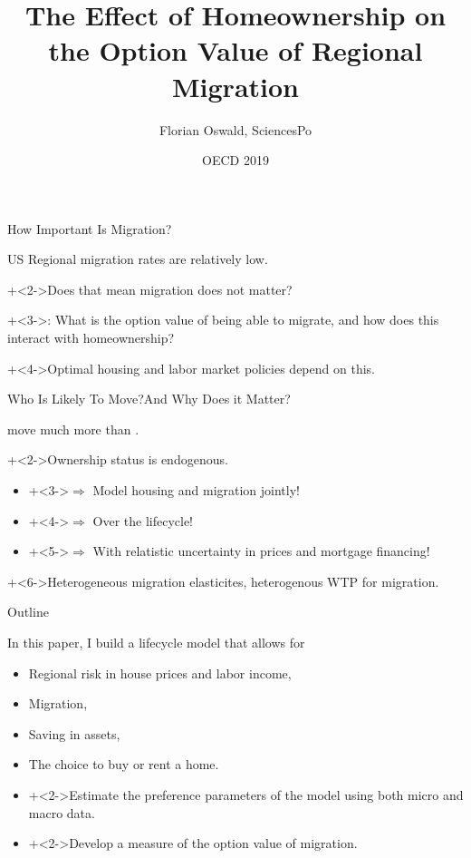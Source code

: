 \documentclass[12pt,english, aspectratio=169]{beamer}
\author{Florian Oswald, SciencesPo}
\date{OECD 2019}
\begin{document}
\title{
The Effect of Homeownership on the Option Value of Regional Migration
}

\frame{\titlepage}

\begin{frame}{How Important Is Migration?}
\begin{midi}
\item US Regional migration rates are relatively low.
\item \onslide+<2->Does that mean migration does not matter?
\item \onslide+<3->: What is the option value of being able to migrate, and how does this interact with homeownership?
\item \onslide+<4->Optimal housing and labor market policies depend on
this.
\end{midi}
\end{frame}

\begin{frame}{Who Is Likely To Move?}{And Why Does it Matter?}

\begin{midi}
 \item {} move much more than .
 \item \onslide+<2->Ownership status is endogenous.
 	\begin{itemize}
		 \item \onslide+<3->$\Rightarrow$ Model housing and migration jointly!
		 \item \onslide+<4->$\Rightarrow$ Over the lifecycle!
		 \item \onslide+<5->$\Rightarrow$ With relatistic uncertainty in prices and mortgage financing!
 	\end{itemize}
 	\item \onslide+<6->Heterogeneous migration elasticites, heterogenous WTP for migration.
 \end{midi} 

\end{frame}

\begin{frame}{Outline}

In this paper, I build a lifecycle model that allows for

\begin{itemize}
\item Regional risk in house prices and labor income,
\item Migration, 
\item Saving in assets,
\item The choice to buy or rent a home.
\end{itemize}
\medskip{}

\begin{itemize}
\item \onslide+<2->Estimate the preference parameters of the model using
both micro and macro data.
\item \onslide+<2->Develop a measure of the option value of migration.

\end{itemize}
\end{frame}
\end{document}
